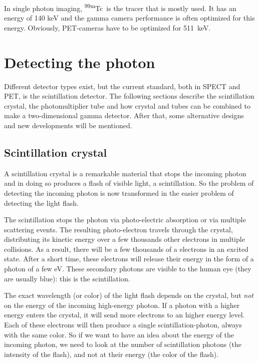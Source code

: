 \documentclass[11pt,oneside]{book}
\begin{document}
In single photon imaging, \textsuperscript{99m}Tc\ is the tracer that is mostly used. It has
an energy of 140 keV and the gamma camera performance is often optimized for
this energy.  Obviously, PET-cameras have to be optimized for 511~keV.

\section{Detecting the photon}
Different detector types exist, but the current standard, both in SPECT and
PET, is the scintillation detector. The following sections describe the
scintillation crystal, the photomultiplier tube and how crystal and tubes
can be combined to make a two-dimensional gamma detector. After that, some
alternative designs and new developments will be mentioned.

\subsection{Scintillation crystal}
A scintillation crystal is a remarkable material that stops the incoming
photon and in doing so produces a flash of visible light, a scintillation.
So the problem of detecting the incoming photon is now transformed in the
easier problem of detecting the light flash.

The scintillation stops the photon via photo-electric absorption or via
multiple scattering events. The resulting photo-electron travels through the
crystal, distributing its kinetic energy over a few thousands other electrons
in multiple collisions. As a result, there will be a few thousands of a
electrons in an excited state. After a short time, these electrons will
release their energy in the form of a photon of a few eV. These secondary
photons are visible to the human eye (they are usually blue): this is the
scintillation.

The exact wavelength (or color) of the light flash depends on the crystal,
but {\em not} on the energy of the incoming high-energy photon. If a photon
with a higher energy enters the crystal, it will send more electrons to an
higher energy level. Each of these electrons will then produce a single
scintillation-photon, always with the same color. So if we want to have an
idea about the energy of the incoming photon, we need to look at the number
of scintillation photons (the intensity of the flash), and not at their
energy (the color of the flash).
\end{document}
